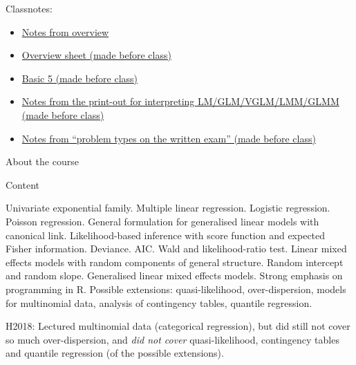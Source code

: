 \documentclass[ignorenonframetext,]{beamer}
\providecommand{\tightlist}{%
  \setlength{\itemsep}{0pt}\setlength{\parskip}{0pt}}
\begin{document}
\begin{frame}

\begin{block}{Classnotes:}

\begin{itemize}
\tightlist
\item
  \href{https://www.math.ntnu.no/emner/TMA4315/2018h/M9PL.pdf}{Notes
  from overview}
\item
  \href{https://www.math.ntnu.no/emner/TMA4315/2018h/Summingup2018.pdf}{Overview
  sheet (made before class)}
\item
  \href{https://www.math.ntnu.no/emner/TMA4315/2018h/Basic5.pdf}{Basic 5
  (made before class)}
\item
  \href{https://www.math.ntnu.no/emner/TMA4315/2018h/9FinalRpart.pdf}{Notes
  from the print-out for interpreting LM/GLM/VGLM/LMM/GLMM (made before
  class)}
\item
  \href{https://www.math.ntnu.no/emner/TMA4315/2018h/GLMexam2018.pdf}{Notes
  from ``problem types on the written exam'' (made before class)}
\end{itemize}

\end{block}

\end{frame}

\begin{frame}{About the course}

\begin{block}{Content}

Univariate exponential family. Multiple linear regression. Logistic
regression. Poisson regression. General formulation for generalised
linear models with canonical link. Likelihood-based inference with score
function and expected Fisher information. Deviance. AIC. Wald and
likelihood-ratio test. Linear mixed effects models with random
components of general structure. Random intercept and random slope.
Generalised linear mixed effects models. Strong emphasis on programming
in R. Possible extensions: quasi-likelihood, over-dispersion, models for
multinomial data, analysis of contingency tables, quantile regression.

H2018: Lectured multinomial data (categorical regression), but did still
not cover so much over-dispersion, and \emph{did not cover}
quasi-likelihood, contingency tables and quantile regression (of the
possible extensions).

\end{block}

\end{frame}
\end{document}
